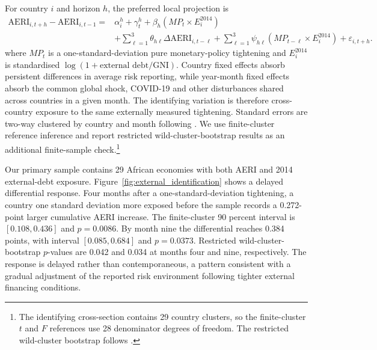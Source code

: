 \documentclass[12pt]{article}
\begin{document}
For country $i$ and horizon $h$, the preferred local projection is
\begin{equation}
\begin{aligned}
\mathrm{AERI}_{i,t+h}-\mathrm{AERI}_{i,t-1}
={}&\alpha_i^h+\gamma_t^h+\beta_h\left(MP_t\times E_i^{2014}\right)\\
&+\sum_{\ell=1}^{3}\theta_{h\ell}\Delta\mathrm{AERI}_{i,t-\ell}
+\sum_{\ell=1}^{3}\psi_{h\ell}\left(MP_{t-\ell}\times E_i^{2014}\right)
+\varepsilon_{i,t+h}.
\end{aligned}
\label{eq:external_id}
\end{equation}
where $MP_t$ is a one-standard-deviation pure monetary-policy tightening and $E_i^{2014}$ is standardised $\log(1+\text{external debt/GNI})$. Country fixed effects absorb persistent differences in average risk reporting, while year-month fixed effects absorb the common global shock, COVID-19 and other disturbances shared across countries in a given month. The identifying variation is therefore cross-country exposure to the same externally measured tightening. Standard errors are two-way clustered by country and month following \citet{cameron2011}. We use finite-cluster reference inference and report restricted wild-cluster-bootstrap results as an additional finite-sample check.\footnote{The identifying cross-section contains 29 country clusters, so the finite-cluster $t$ and $F$ references use 28 denominator degrees of freedom. The restricted wild-cluster bootstrap follows \citet{mackinnon2017}.}

Our primary sample contains 29 African economies with both AERI and 2014 external-debt exposure. Figure~\ref{fig:external_identification} shows a delayed differential response. Four months after a one-standard-deviation tightening, a country one standard deviation more exposed before the sample records a 0.272-point larger cumulative AERI increase. The finite-cluster 90 percent interval is $[0.108,0.436]$ and $p=0.0086$. By month nine the differential reaches 0.384 points, with interval $[0.085,0.684]$ and $p=0.0373$. Restricted wild-cluster-bootstrap $p$-values are 0.042 and 0.034 at months four and nine, respectively. The response is delayed rather than contemporaneous, a pattern consistent with a gradual adjustment of the reported risk environment following tighter external financing conditions.
\end{document}
